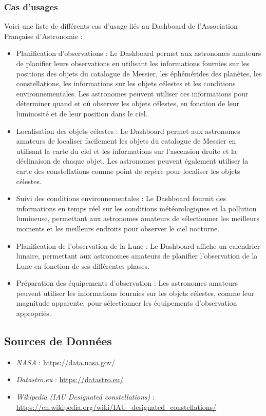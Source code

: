 \documentclass{article}
\begin{document}
\subsubsection{Cas d'usages}
Voici une liste de différents cas d'usage liés au Dashboard de l'Association Française d'Astronomie :
\begin{itemize}
	\setlength\itemsep{0.5em}
	\item Planification d'observations : Le Dashboard permet aux astronomes amateurs de planifier leurs observations en utilisant les informations fournies sur les positions des objets du catalogue de Messier, les éphémérides des planètes, les constellations, les informations sur les objets célestes et les conditions environnementales. Les astronomes peuvent utiliser ces informations pour déterminer quand et où observer les objets célestes, en fonction de leur luminosité et de leur position dans le ciel.
	\item Localisation des objets célestes : Le Dashboard permet aux astronomes amateurs de localiser facilement les objets du catalogue de Messier en utilisant la carte du ciel et les informations sur l'ascension droite et la déclinaison de chaque objet. Les astronomes peuvent également utiliser la carte des constellations comme point de repère pour localiser les objets célestes.
	\item Suivi des conditions environnementales : Le Dashboard fournit des informations en temps réel sur les conditions météorologiques et la pollution lumineuse, permettant aux astronomes amateurs de sélectionner les meilleurs moments et les meilleurs endroits pour observer le ciel nocturne.
	\item Planification de l'observation de la Lune : Le Dashboard affiche un calendrier lunaire, permettant aux astronomes amateurs de planifier l'observation de la Lune en fonction de ses différentes phases.
	\item Préparation des équipements d'observation : Les astronomes amateurs peuvent utiliser les informations fournies sur les objets célestes, comme leur magnitude apparente, pour sélectionner les équipements d'observation appropriés.
\end{itemize}

\subsection{Sources de Données}
\begin{itemize}[leftmargin=*]
	\item \textit{NASA} : \url{https://data.nasa.gov/}
	\item \textit{Datastro.eu} : \url{https://datastro.eu/}
	\item \textit{Wikipedia (IAU Designated constellations)} :\\\url{https://en.wikipedia.org/wiki/IAU_designated_constellations/}
\end{itemize}
\end{document}
